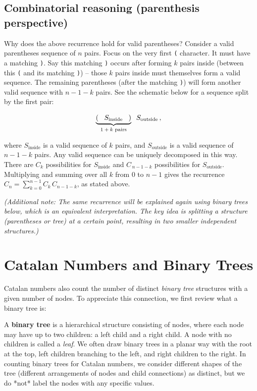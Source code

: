 \documentclass[docmute]{article}
\begin{document}
\subsection*{Combinatorial reasoning (parenthesis perspective)}

Why does the above recurrence hold for valid parentheses? Consider a valid parentheses sequence of $n$ pairs. Focus on the very first \texttt{(} character. It must have a matching \texttt{)}. Say this matching \texttt{)} occurs after forming $k$ pairs inside (between this \texttt{(} and its matching \texttt{)}) -- those $k$ pairs inside must themselves form a valid sequence. The remaining parentheses (after the matching \texttt{)}) will form another valid sequence with $n-1-k$ pairs. See the schematic below for a sequence split by the first pair:

\[
\underbrace{\vphantom{()}( \;\;\; S_{\text{inside}} \;\;\; )}_{\text{$1+k$ pairs}} \;\; S_{\text{outside}}\,,
\] 

where $S_{\text{inside}}$ is a valid sequence of $k$ pairs, and $S_{\text{outside}}$ is a valid sequence of $n-1-k$ pairs. Any valid sequence can be uniquely decomposed in this way. There are $C_k$ possibilities for $S_{\text{inside}}$ and $C_{\,n-1-k}$ possibilities for $S_{\text{outside}}$. Multiplying and summing over all $k$ from $0$ to $n-1$ gives the recurrence $C_n = \sum_{k=0}^{n-1} C_k\,C_{n-1-k}$, as stated above.

\textit{(Additional note: The same recurrence will be explained again using binary trees below, which is an equivalent interpretation. The key idea is splitting a structure (parentheses or tree) at a certain point, resulting in two smaller independent structures.)}

\section{Catalan Numbers and Binary Trees}

Catalan numbers also count the number of distinct \emph{binary tree} structures with a given number of nodes. To appreciate this connection, we first review what a binary tree is:

A \textbf{binary tree} is a hierarchical structure consisting of nodes, where each node may have up to two children: a left child and a right child. A node with no children is called a \emph{leaf}. We often draw binary trees in a planar way with the root at the top, left children branching to the left, and right children to the right. In counting binary trees for Catalan numbers, we consider different shapes of the tree (different arrangements of nodes and child connections) as distinct, but we do *not* label the nodes with any specific values.
\end{document}
